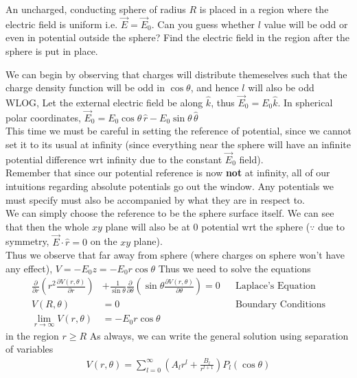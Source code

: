 \documentclass[../main.tex]{subfiles}
\begin{document}
\begin{questions}
	\question An uncharged, conducting sphere of radius $R$ is placed in a region where the electric field is uniform i.e. $\vec{E} = \vec{E}_0$. Can you guess whether $l$ value will be odd or even in potential outside the sphere? Find the electric field in
	the region after the sphere is put in place.
	\begin{solution}
		We can begin by observing that charges will distribute themeselves such that the charge density function will be odd in $\cos\theta$, and hence $l$ will also be odd\\
		WLOG, Let the external electric field be along $\hat{k}$, thus $\vec{E}_0 = E_0\hat{k}$. In spherical polar coordinates, $\vec{E}_0 = E_0 \cos\theta\,\hat{r} - E_0\sin\theta\,\hat{\theta}$\\
		This time we must be careful in setting the reference of potential, since we cannot set it to its usual at infinity (since everything near the sphere will have an infinite potential difference wrt infinity due to the constant $\vec{E}_0$ field). \\
		Remember that since our potential reference is now \textbf{not} at infinity, all of our intuitions regarding absolute potentials go out the window. Any potentials we must specify must also be accompanied by what they are in respect to. \\
		We can simply choose the reference to be the sphere surface itself. We can see that then the whole $xy$ plane will also be at 0 potential wrt the sphere ($\because$ due to symmetry, $\vec{E}\cdot\hat{r}=0$ on the $xy$ plane).\\
		Thus we observe that far away from sphere (where charges on sphere won't have any effect), $V = -E_0z = -E_0 r\cos\theta$
		Thus we need to solve the equations
		\begin{align}
			\frac{\partial}{\partial r}\left(r^2\frac{\partial V(r,\theta)}{\partial r}\right) &+ \frac{1}{\sin\theta}\frac{\partial}{\partial \theta}\left(\sin\theta\frac{\partial V(r,\theta)}{\partial \theta}\right) = 0 && \text{Laplace's Equation}\\
			V(R,\theta) &= 0 && \text{Boundary Conditions}\label{eq:rbc71}\\
			\lim_{r\to\infty}V(r,\theta) &= -E_0r\cos\theta\label{eq:rbc72}
		\end{align}
		in the region $r\geq R$
		As always, we can write the general solution using separation of variables
		\begin{align}
			V(r,\theta) = \sum_{l=0}^{\infty} \left(A_l r^l + \frac{B_l}{r^{l+1}}\right)P_l(\cos\theta)

\end{align}
\end{solution}
\end{questions}
\end{document}
